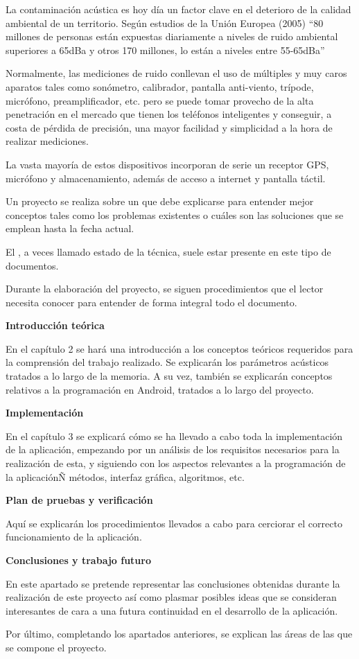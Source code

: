     La contaminación acústica es hoy día un factor clave en el deterioro de la calidad ambiental de un territorio. Según estudios de la Unión Europea (2005) “80 millones de personas están expuestas diariamente a niveles de ruido ambiental superiores a 65dBa y otros 170 millones, lo están a niveles entre 55-65dBa”
    
    Normalmente, las mediciones de ruido conllevan el uso de múltiples y muy caros aparatos tales como sonómetro, calibrador, pantalla anti-viento, trípode, micrófono, preamplificador, etc. pero se puede tomar provecho de la alta penetración en el mercado que tienen los teléfonos inteligentes y conseguir, a costa de pérdida de precisión, una mayor facilidad y simplicidad a la hora de realizar mediciones.
    
    La vasta mayoría de estos dispositivos incorporan de serie un receptor GPS, micrófono y almacenamiento, además de acceso a internet y pantalla táctil.\

	Un proyecto se realiza sobre un  que debe explicarse para entender mejor conceptos tales como los problemas existentes o cuáles son las soluciones que se emplean hasta la fecha actual.

	El , a veces llamado estado de la técnica, suele estar presente en este tipo de documentos.
  
	Durante la elaboración del proyecto, se siguen procedimientos que el lector necesita conocer para entender de forma integral todo el documento.


\textbf{Introducción teórica}

En el capítulo 2 se hará una introducción a los conceptos teóricos requeridos para la comprensión del trabajo realizado.
Se explicarán los parámetros acústicos tratados a lo largo de la memoria.
A su vez, también se explicarán conceptos relativos a la programación en Android, tratados a lo largo del proyecto.

\textbf{Implementación}

En el capítulo 3 se explicará cómo se ha llevado a cabo toda la implementación de la aplicación, empezando por un análisis de los requisitos necesarios para la realización de esta, y siguiendo con los aspectos relevantes a la programación de la aplicaciónÑ métodos, interfaz gráfica, algoritmos, etc.

\textbf{Plan de pruebas y verificación}

Aquí se explicarán los procedimientos llevados a cabo para cerciorar el correcto funcionamiento de la aplicación.

\textbf{Conclusiones y trabajo futuro}

En este apartado se pretende representar las conclusiones obtenidas durante la realización de este proyecto así como plasmar posibles ideas que se consideran interesantes de cara a una futura continuidad en el desarrollo de la aplicación.

	Por último, completando los apartados anteriores, se explican las áreas de las que se compone el proyecto.

\chapterend